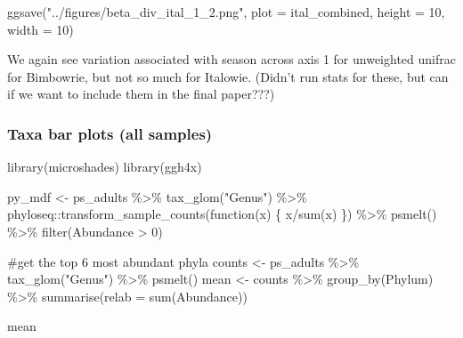 \documentclass[
  letterpaper,
  DIV=11,
  numbers=noendperiod]{scrartcl}
\newenvironment{Shaded}{\begin{snugshade}}{\end{snugshade}}
\newcommand{\AttributeTok}[1]{\textcolor[rgb]{0.40,0.45,0.13}{#1}}
\newcommand{\CommentTok}[1]{\textcolor[rgb]{0.37,0.37,0.37}{#1}}
\newcommand{\ControlFlowTok}[1]{\textcolor[rgb]{0.00,0.23,0.31}{#1}}
\newcommand{\DecValTok}[1]{\textcolor[rgb]{0.68,0.00,0.00}{#1}}
\newcommand{\FunctionTok}[1]{\textcolor[rgb]{0.28,0.35,0.67}{#1}}
\newcommand{\NormalTok}[1]{\textcolor[rgb]{0.00,0.23,0.31}{#1}}
\newcommand{\OtherTok}[1]{\textcolor[rgb]{0.00,0.23,0.31}{#1}}
\newcommand{\SpecialCharTok}[1]{\textcolor[rgb]{0.37,0.37,0.37}{#1}}
\newcommand{\StringTok}[1]{\textcolor[rgb]{0.13,0.47,0.30}{#1}}
\begin{document}
\begin{Shaded}
\begin{Highlighting}[]
\FunctionTok{ggsave}\NormalTok{(}\StringTok{"../figures/beta\_div\_ital\_1\_2.png"}\NormalTok{, }\AttributeTok{plot =}\NormalTok{ ital\_combined, }\AttributeTok{height =} \DecValTok{10}\NormalTok{, }\AttributeTok{width =} \DecValTok{10}\NormalTok{)}
\end{Highlighting}
\end{Shaded}

We again see variation associated with season across axis 1 for
unweighted unifrac for Bimbowrie, but not so much for Italowie. (Didn't
run stats for these, but can if we want to include them in the final
paper???)

\subsubsection{Taxa bar plots (all
samples)}\label{taxa-bar-plots-all-samples}

\begin{Shaded}
\begin{Highlighting}[]
\FunctionTok{library}\NormalTok{(microshades)}
\FunctionTok{library}\NormalTok{(ggh4x)}

\NormalTok{py\_mdf }\OtherTok{\textless{}{-}}\NormalTok{ ps\_adults }\SpecialCharTok{\%\textgreater{}\%}
  \FunctionTok{tax\_glom}\NormalTok{(}\StringTok{"Genus"}\NormalTok{) }\SpecialCharTok{\%\textgreater{}\%}
\NormalTok{  phyloseq}\SpecialCharTok{::}\FunctionTok{transform\_sample\_counts}\NormalTok{(}\ControlFlowTok{function}\NormalTok{(x) \{ x}\SpecialCharTok{/}\FunctionTok{sum}\NormalTok{(x) \}) }\SpecialCharTok{\%\textgreater{}\%}
  \FunctionTok{psmelt}\NormalTok{() }\SpecialCharTok{\%\textgreater{}\%}
  \FunctionTok{filter}\NormalTok{(Abundance }\SpecialCharTok{\textgreater{}} \DecValTok{0}\NormalTok{)}

\CommentTok{\#get the top 6 most abundant phyla}
\NormalTok{counts }\OtherTok{\textless{}{-}}\NormalTok{ ps\_adults }\SpecialCharTok{\%\textgreater{}\%}
  \FunctionTok{tax\_glom}\NormalTok{(}\StringTok{"Genus"}\NormalTok{) }\SpecialCharTok{\%\textgreater{}\%}
  \FunctionTok{psmelt}\NormalTok{()}
\NormalTok{mean }\OtherTok{\textless{}{-}}\NormalTok{ counts }\SpecialCharTok{\%\textgreater{}\%}
  \FunctionTok{group\_by}\NormalTok{(Phylum) }\SpecialCharTok{\%\textgreater{}\%}
  \FunctionTok{summarise}\NormalTok{(}\AttributeTok{relab =} \FunctionTok{sum}\NormalTok{(Abundance))}

\NormalTok{mean}
\end{Highlighting}
\end{Shaded}
\end{document}
